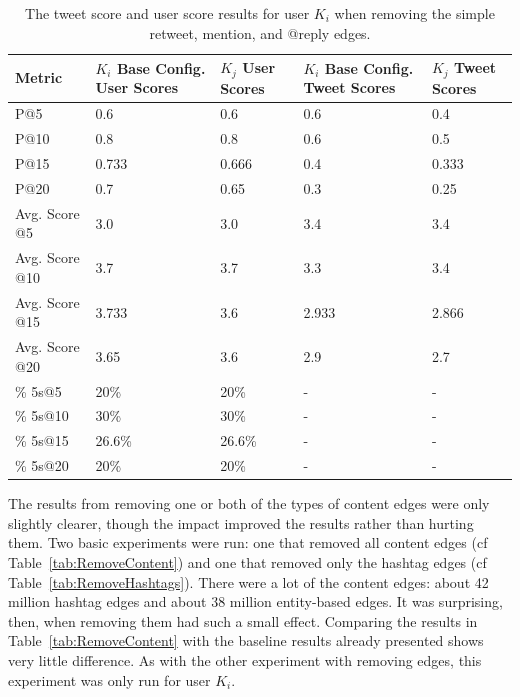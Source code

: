 \begin{table}
\centering
\begin{tabular}{l|p{2cm}|p{2cm}|p{2cm}|p{2cm}}
{\bf Metric} & {\bf $K_{i}$ Base Config. User Scores} & {\bf $K_{j}$ User Scores} & {\bf $K_{i}$ Base Config. Tweet Scores} & {\bf $K_{j}$ Tweet Scores} \\ \hline
P@5   & 0.6 & 0.6 & 0.6 & 0.4 \\ \hline
P@10 & 0.8 & 0.8 & 0.6 & 0.5 \\ \hline
P@15 & 0.733 & 0.666 & 0.4 & 0.333 \\ \hline
P@20 & 0.7 & 0.65 & 0.3 & 0.25 \\ \hline

Avg. Score @5   & 3.0 & 3.0 & 3.4 & 3.4 \\ \hline
Avg. Score @10 & 3.7 & 3.7 & 3.3 & 3.4 \\ \hline
Avg. Score @15 & 3.733 & 3.6 & 2.933 & 2.866 \\ \hline
Avg. Score @20 & 3.65 & 3.6 & 2.9 & 2.7 \\ \hline

\% 5s@5    & 20\% & 20\% & - & - \\ \hline
\% 5s@10  & 30\% & 30\% & - & - \\ \hline
\% 5s@15  & 26.6\% & 26.6\% & - & - \\ \hline
\% 5s@20  & 20\% & 20\% & - & - \\

\end{tabular}
\caption[Results of removing the simple retweet, mention, and @reply edges.]{The tweet score and user score results for user $K_{i}$ when removing the simple retweet, mention, and @reply edges.}
\label{tab:Remove369}
\end{table}



The results from removing one or both of the types of content edges were only slightly clearer, though the impact improved the results rather than hurting them. Two basic experiments were run: one that removed all content edges (cf Table~\ref{tab:RemoveContent}) and one that removed only the hashtag edges (cf Table~\ref{tab:RemoveHashtags}). There were a lot of the content edges: about 42 million hashtag edges and about 38 million entity-based edges. It was surprising, then, when removing them had such a small effect. Comparing the results in Table~\ref{tab:RemoveContent} with the baseline results already presented shows very little difference. As with the other experiment with removing edges, this experiment was only run for user $K_{i}$.

